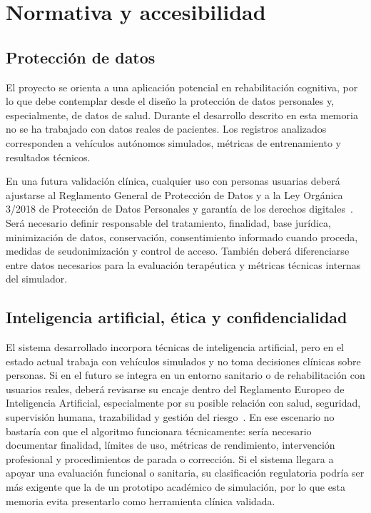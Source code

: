 \chapter{Normativa y accesibilidad}

\section{Protección de datos}

El proyecto se orienta a una aplicación potencial en rehabilitación cognitiva, por lo que debe contemplar desde el diseño la protección de datos personales y, especialmente, de datos de salud. Durante el desarrollo descrito en esta memoria no se ha trabajado con datos reales de pacientes. Los registros analizados corresponden a vehículos autónomos simulados, métricas de entrenamiento y resultados técnicos.

En una futura validación clínica, cualquier uso con personas usuarias deberá ajustarse al Reglamento General de Protección de Datos y a la Ley Orgánica 3/2018 de Protección de Datos Personales y garantía de los derechos digitales~\cite{rgpd,lopdgdd}. Será necesario definir responsable del tratamiento, finalidad, base jurídica, minimización de datos, conservación, consentimiento informado cuando proceda, medidas de seudonimización y control de acceso. También deberá diferenciarse entre datos necesarios para la evaluación terapéutica y métricas técnicas internas del simulador.

\section{Inteligencia artificial, ética y confidencialidad}

El sistema desarrollado incorpora técnicas de inteligencia artificial, pero en el estado actual trabaja con vehículos simulados y no toma decisiones clínicas sobre personas. Si en el futuro se integra en un entorno sanitario o de rehabilitación con usuarios reales, deberá revisarse su encaje dentro del Reglamento Europeo de Inteligencia Artificial, especialmente por su posible relación con salud, seguridad, supervisión humana, trazabilidad y gestión del riesgo~\cite{aiact}. En ese escenario no bastaría con que el algoritmo funcionara técnicamente: sería necesario documentar finalidad, límites de uso, métricas de rendimiento, intervención profesional y procedimientos de parada o corrección. Si el sistema llegara a apoyar una evaluación funcional o sanitaria, su clasificación regulatoria podría ser más exigente que la de un prototipo académico de simulación, por lo que esta memoria evita presentarlo como herramienta clínica validada.


